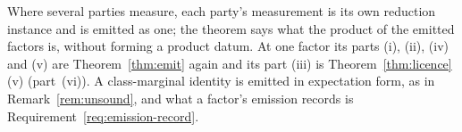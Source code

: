 
Where several parties measure, each party's measurement is its own
reduction instance and is emitted as one; the theorem says what the product
of the emitted factors is, without forming a product datum. At one factor its
parts (i), (ii), (iv) and (v) are Theorem~\ref{thm:emit} again and its part
(iii) is Theorem~\ref{thm:licence}\,(v) (part~(vi)). A class-marginal
identity is emitted in expectation form, as in Remark~\ref{rem:unsound}, and
what a factor's emission records is Requirement~\ref{req:emission-record}.

